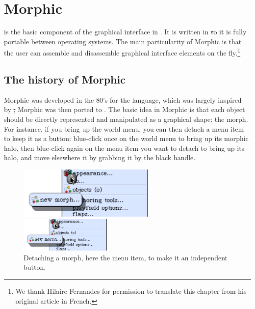 \documentclass[a4paper,10pt,twoside]{book}
\begin{document}
	\renewcommand{\nnbb}[2]{} %
	\sloppy
\fi
\chapter{Morphic}


 is the basic component of the graphical interface in \sq.
It is written in \st so it is fully portable between operating systems.
The main particularity of Morphic is that the user can assemble and disassemble graphical interface elements on the fly.\footnote{We thank Hilaire Fernandes for permission to translate this chapter from his original article in French.}


\section{The history of Morphic}

Morphic was developed in the 80's for the  language, which was largely inspired by \st; Morphic was then ported to \sq.
The basic idea in Morphic is that each object should be directly represented and manipulated as a graphical shape: the morph.
For instance, if you bring up the world menu, you can then detach a menu item to keep it as a button:
blue-click once on the world menu to bring up its morphic halo, then blue-click again on the menu item you want to detach to bring up its halo, and move elsewhere it by grabbing it by the black handle.

\begin{figure}[ht]
	\ifluluelse
		{\centerline{\includegraphics[width=0.6\textwidth]{detachingMenu}}}
		{\centerline{\includegraphics[width=0.4\textwidth]{detachingMenu}}}
	\caption{Detaching a morph, here the  menu item, to make it an independent button.
		\label{fig:detachingMenu}}
\end{figure}
\end{document}
